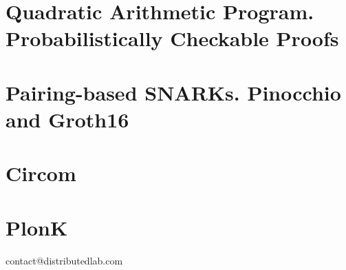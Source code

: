 \documentclass{zkdl-template}
\begin{document}
\label{section:circuits}

\section[Quadratic Arithmetic Program]{Quadratic Arithmetic Program. Probabilistically Checkable Proofs}



\section[Pairing-based SNARKs]{Pairing-based SNARKs. Pinocchio and Groth16}



\section{Circom}\label{section:circom}



\section{PlonK}\label{section:plonk}




% 


    \newpage
    \pagestyle{empty}
    
    \ifodd\value{page}
        \newpage
    \fi
    
    \vspace*{\fill}
    
    \begin{center}
        contact@distributedlab.com
    \end{center}
    
    \vspace*{\fill}
\end{document}
